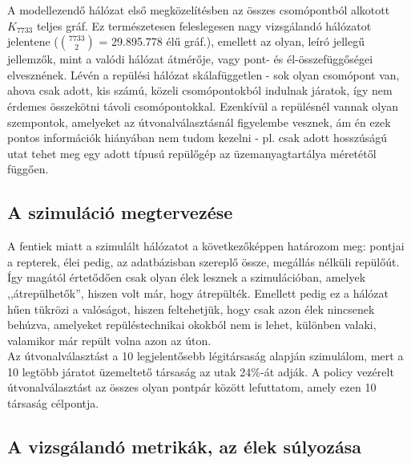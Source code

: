     A modellezendő hálózat első megközelítésben az összes csomópontból alkotott $K_{7733}$ teljes gráf. Ez természetesen feleslegesen nagy vizsgálandó hálózatot jelentene ($7733 \choose 2$ = 29.895.778 élű gráf.), emellett az olyan, leíró jellegű jellemzők, mint a valódi hálózat átmérője, vagy pont- és él-összefüggőségei elvesznének. Lévén a repülési hálózat skálafüggetlen - sok olyan csomópont van, ahova csak adott, kis számú, közeli csomópontokból indulnak járatok, így nem érdemes összekötni távoli csomópontokkal. Ezenkívül a repülésnél vannak olyan szempontok, amelyeket az útvonalválasztásnál figyelembe vesznek, ám én ezek pontos információk hiányában nem tudom kezelni - pl. csak adott hosszúságú utat tehet meg egy adott típusú repülőgép az üzemanyagtartálya méretétől függően.

    \subsection{A szimuláció megtervezése}

    A fentiek miatt a szimulált hálózatot a következőképpen határozom meg: pontjai a repterek, élei pedig, az adatbázisban szereplő össze, megállás nélküli repülőút. Így magától értetődően csak olyan élek lesznek a szimulációban, amelyek ,,átrepülhetők'', hiszen volt már, hogy átrepülték. Emellett pedig ez a hálózat hűen tükrözi a valóságot, hiszen feltehetjük, hogy csak azon élek nincsenek behúzva, amelyeket repüléstechnikai okokból nem is lehet, különben valaki, valamikor már repült volna azon az úton.\\

    Az útvonalválasztást a 10 legjelentősebb légitársaság alapján szimulálom, mert a 10 legtöbb járatot üzemeltető társaság az utak 24\%-át adják. A policy vezérelt útvonalválasztást az összes olyan pontpár között lefuttatom, amely ezen 10 társaság célpontja.



    \subsection{A vizsgálandó metrikák, az élek súlyozása}

